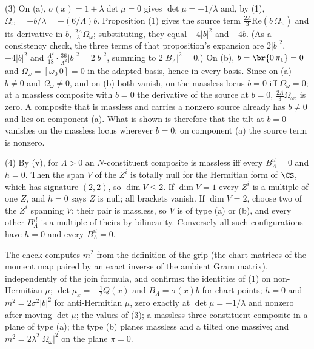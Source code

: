 (3) On (a), $\sigma(x) = 1 + \lambda\det\mu = 0$ gives $\det\mu = -1/\lambda$ and, by (1), $\Omega_{\omega} = -b/\lambda = -(6/\Lambda)b$. Proposition (1) gives the source term $\tfrac{2\Lambda}{3}\mathrm{Re}(\overline{b}\,\Omega_{\omega})$ and its derivative in $b$, $\tfrac{2\Lambda}{3}\Omega_{\omega}$; substituting, they equal $-4|b|^{2}$ and $-4b$. (As a consistency check, the three terms of that proposition's expansion are $2|b|^{2}$, $-4|b|^{2}$ and $\tfrac{\Lambda^{2}}{18}\cdot\tfrac{36}{\Lambda^{2}}|b|^{2} = 2|b|^{2}$, summing to $2|B_{\Lambda}|^{2} = 0$.) On (b), $b = \br{0\,\pi_{1}} = 0$ and $\Omega_{\omega} = [\omega_{0}\,0] = 0$ in the adapted basis, hence in every basis. Since on (a) $b \neq 0$ and $\Omega_{\omega} \neq 0$, and on (b) both vanish, on the massless locus $b = 0$ iff $\Omega_{\omega} = 0$; at a massless composite with $b = 0$ the derivative of the source at $b = 0$, $\tfrac{2\Lambda}{3}\Omega_{\omega}$, is zero. A composite that is massless and carries a nonzero source already has $b \neq 0$ and lies on component (a). What is shown is therefore that the tilt at $b = 0$ vanishes on the massless locus wherever $b = 0$; on component (a) the source term is nonzero.

(4) By (v), for $\Lambda > 0$ an $N$-constituent composite is massless iff every $B^{il}_{\Lambda} = 0$ and $h = 0$. Then the span $V$ of the $Z^{i}$ is totally null for the Hermitian form of $\CS$, which has signature $(2,2)$, so $\dim V \le 2$. If $\dim V = 1$ every $Z^{i}$ is a multiple of one $Z$, and $h = 0$ says $Z$ is null; all brackets vanish. If $\dim V = 2$, choose two of the $Z^{i}$ spanning $V$; their pair is massless, so $V$ is of type (a) or (b), and every other $B^{il}_{\Lambda}$ is a multiple of theirs by bilinearity. Conversely all such configurations have $h = 0$ and every $B^{il}_{\Lambda} = 0$.

The check computes $m^{2}$ from the definition of the grip (the chart matrices of the moment map paired by an exact inverse of the ambient Gram matrix), independently of the join formula, and confirms: the identities of (1) on non-Hermitian $\mu$; $\det\mu_{x} = -\tfrac12 Q(x)$ and $B_{\Lambda} = \sigma(x)b$ for chart points; $h = 0$ and $m^{2} = 2\sigma^{2}|b|^{2}$ for anti-Hermitian $\mu$, zero exactly at $\det\mu = -1/\lambda$ and nonzero after moving $\det\mu$; the values of (3); a massless three-constituent composite in a plane of type (a); the type (b) planes massless and a tilted one massive; and $m^{2} = 2\lambda^{2}|\Omega_{\omega}|^{2}$ on the plane $\pi = 0$.
